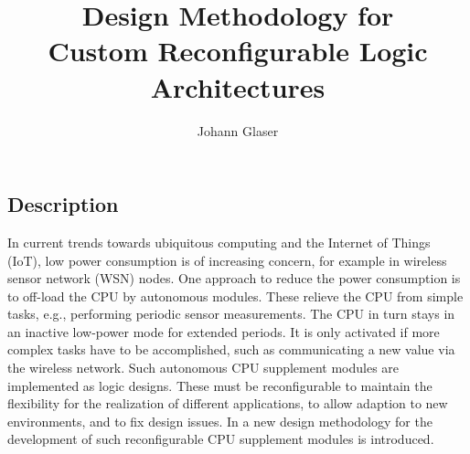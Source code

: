 \documentclass[a4paper,12pt,onsided]{article}
\title{\vspace{-1mm}\sf Design Methodology for\\[2mm]Custom Reconfigurable Logic Architectures}
\date{}  %
\author{Johann Glaser}
\begin{document}
\pagestyle{empty}
\maketitle
\thispagestyle{empty} %

\subsection*{Description}

In current trends towards ubiquitous computing and the Internet of Things (IoT), low power consumption is of
increasing concern, for example in wireless sensor network (WSN) nodes. One approach
to reduce the power consumption is to off-load the CPU by autonomous modules. These
relieve the CPU from simple tasks, e.g., performing periodic sensor
measurements. The CPU in turn stays in an inactive low-power mode for extended periods. It
is only activated if more complex tasks have to be accomplished, such as
communicating a new value
via the wireless network. Such autonomous CPU supplement modules are
implemented as logic designs. These must be reconfigurable to
maintain the flexibility for the realization of different applications, to
allow adaption to new environments, and to fix design issues. In
 \cite{Gla15} a new design methodology for the development of such reconfigurable CPU supplement
modules is introduced.

\end{document}

